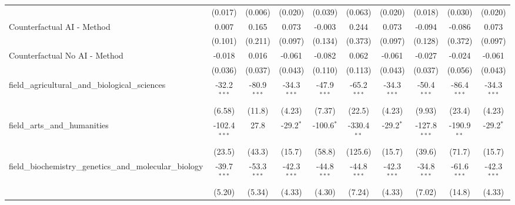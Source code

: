 \begin{tabular}{lccccccccc}
                                                               & (0.017)        & (0.006)        & (0.020)       & (0.039)        & (0.063)        & (0.020)       & (0.018)        & (0.030)        & (0.020)\\   
   Counterfactual AI - Method                                  & 0.007          & 0.165          & 0.073         & -0.003         & 0.244          & 0.073         & -0.094         & -0.086         & 0.073\\   
                                                               & (0.101)        & (0.211)        & (0.097)       & (0.134)        & (0.373)        & (0.097)       & (0.128)        & (0.372)        & (0.097)\\   
   Counterfactual No AI - Method                               & -0.018         & 0.016          & -0.061        & -0.082         & 0.062          & -0.061        & -0.027         & -0.024         & -0.061\\   
                                                               & (0.036)        & (0.037)        & (0.043)       & (0.110)        & (0.113)        & (0.043)       & (0.037)        & (0.056)        & (0.043)\\   
   field\_agricultural\_and\_biological\_sciences              & -32.2$^{***}$  & -80.9$^{***}$  & -34.3$^{***}$ & -47.9$^{***}$  & -65.2$^{***}$  & -34.3$^{***}$ & -50.4$^{***}$  & -86.4$^{***}$  & -34.3$^{***}$\\   
                                                               & (6.58)         & (11.8)         & (4.23)        & (7.37)         & (22.5)         & (4.23)        & (9.93)         & (23.4)         & (4.23)\\   
   field\_arts\_and\_humanities                                & -102.4$^{***}$ & 27.8           & -29.2$^{*}$   & -100.6$^{*}$   & -330.4$^{**}$  & -29.2$^{*}$   & -127.8$^{***}$ & -190.9$^{**}$  & -29.2$^{*}$\\   
                                                               & (23.5)         & (43.3)         & (15.7)        & (58.8)         & (125.6)        & (15.7)        & (39.6)         & (71.7)         & (15.7)\\   
   field\_biochemistry\_genetics\_and\_molecular\_biology      & -39.7$^{***}$  & -53.3$^{***}$  & -42.3$^{***}$ & -44.8$^{***}$  & -44.8$^{***}$  & -42.3$^{***}$ & -34.8$^{***}$  & -61.6$^{***}$  & -42.3$^{***}$\\   
                                                               & (5.20)         & (5.34)         & (4.33)        & (4.30)         & (7.24)         & (4.33)        & (7.02)         & (14.8)         & (4.33)\\   

\end{tabular}
